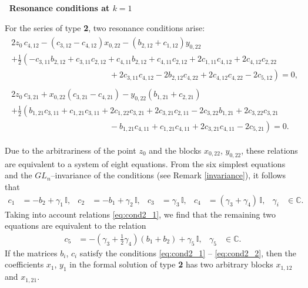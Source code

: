 \documentclass{article}
\theoremstyle{plain}
\newcommand{\brackets}[1]{\left( #1 \right)}
\begin{document}
\medskip
\textbf{\textbullet \, Resonance conditions at $k = 1$}

For the series of type \textbf{2}, two resonance conditions arise:
\begin{gather}
\begin{multlined}
    2 z_0 \, c_{4, 12}
    - \brackets{
    c_{3, 12} - c_{4, 12}
    } x_{0, 22}
    - \brackets{
    b_{2, 12} + c_{1, 12}
    } y_{0, 22}
    \\
    + \frac{1}{2} \left(
    - c_{3, 11} b_{2, 12} 
    + c_{3, 11} c_{2, 12} 
    + c_{4, 11} b_{2, 12} 
    + c_{4, 11} c_{2, 12}
    + 2 c_{1, 11} c_{4, 12}
    + 2 c_{4, 12} c_{2, 22} 
    \right.
    \\
    \left.
    \hspace{5cm}
    + 2 c_{3, 11} c_{4, 12}
    - 2 b_{2, 12} c_{4, 22}
    + 2 c_{4, 12} c_{4, 22}
    - 2 c_{5, 12}
    \right)
    = 0,
\end{multlined}
\\[2mm]
\begin{multlined}
    2 z_0 \, c_{3, 21}
    + x_{0, 22} \brackets{
    c_{3, 21} - c_{4, 21}
    } 
    - y_{0, 22} \brackets{
    b_{1, 21} + c_{2, 21}
    }
    \\
    + \frac{1}{2} \left(
    b_{1, 21} c_{3, 11}
    + c_{1, 21} c_{3, 11}
    + 2 c_{1, 22} c_{3, 21}
    + 2 c_{3, 21} c_{2, 11} 
    - 2 c_{3, 22} b_{1, 21} 
    + 2 c_{3, 22} c_{3, 21} 
    \right.
    \\
    \left.
    \hspace{5cm}
    - b_{1, 21} c_{4, 11}
    + c_{1, 21} c_{4, 11}
    + 2 c_{3, 21} c_{4, 11}
    - 2 c_{5, 21}
    \right)
    = 0.
\end{multlined}
\end{gather}

Due to the arbitrariness of the point $z_0$ and the blocks $x_{0, 22}$, $y_{0, 22}$, these relations are equivalent to a system of eight equations. From the six simplest equations and the $GL_n$--invariance of the conditions (see Remark \ref{invariance}), it follows that
\begin{align} \label{eq:cond2_1}
    c_1
    &= - b_2 + \gamma_1 \, \mathbb{I},
    &
    c_2
    &= - b_1 + \gamma_2 \, \mathbb{I},
    &
    c_3
    &= \gamma_3 \, \mathbb{I},
    &
    c_4
    &= \brackets{\gamma_3 + \gamma_4} \, \mathbb{I},
    &
    \gamma_i
    &\in {\mathbb C}.
\end{align}
Taking into account relations \eqref{eq:cond2_1}, we find that the remaining two equations are equivalent to the relation
\begin{align} \label{eq:cond2_2}
    &&
    c_5
    &= - \brackets{\gamma_3 + \frac{1}{2} \gamma_4} \brackets{b_1 + b_2} 
    + \gamma_5 \, \mathbb{I},
    &
    \gamma_5
    &\in {\mathbb C}.
    &&
\end{align}
If the matrices $b_i$, $c_i$ satisfy the conditions \eqref{eq:cond2_1} -- \eqref{eq:cond2_2}, then the coefficients $x_1$, $y_1$ in the formal solution of  type \textbf{2} has two arbitrary blocks $x_{1, 12}$ and $x_{1, 21}$.
\end{document}
